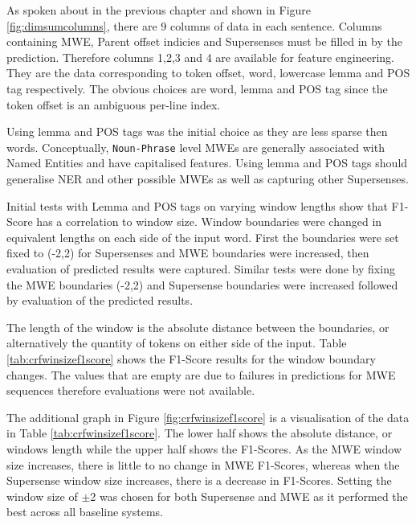 As spoken about in the previous chapter and shown in Figure \ref{fig:dimsumcolumns}, there are 9 columns of data in each sentence. Columns containing MWE, Parent offset indicies and Supersenses must be filled in by the prediction. Therefore columns 1,2,3 and 4 are available for feature engineering. They are the data corresponding to token offset, word, lowercase lemma and POS tag respectively. The obvious choices are word, lemma and POS tag since the token offset is an ambiguous per-line index. 

Using lemma and POS tags was the initial choice as they are less sparse then words. Conceptually, \texttt{Noun-Phrase} level MWEs are generally associated with Named Entities and have capitalised features. Using lemma and POS tags should generalise NER and other possible MWEs as well as capturing other Supersenses. 

Initial tests with Lemma and POS tags on varying window lengths show that F1-Score has a correlation to window size. Window boundaries were changed in equivalent lengths on each side of the input word. First the boundaries were set fixed to (-2,2) for Supersenses and MWE boundaries were increased, then evaluation of predicted results were captured. Similar tests were done by fixing the MWE boundaries (-2,2) and Supersense boundaries were increased followed by evaluation of the predicted results.

The length of the window is the absolute distance between the boundaries, or alternatively the quantity of tokens on either side of the input. Table \ref{tab:crfwinsizef1score} shows the F1-Score results for the window boundary changes. The values that are empty are due to failures in predictions for MWE sequences therefore evaluations were not available. 

The additional graph in Figure \ref{fig:crfwinsizef1score} is a visualisation of the data in Table \ref{tab:crfwinsizef1score}. The lower half shows the absolute distance, or windows length while the upper half shows the F1-Scores. As the MWE window size increases, there is little to no change in MWE F1-Scores, whereas when the Supersense window size increases, there is a decrease in F1-Scores. Setting the window size of $\pm$2 was chosen for both Supersense and MWE as it performed the best across all baseline systems. 

